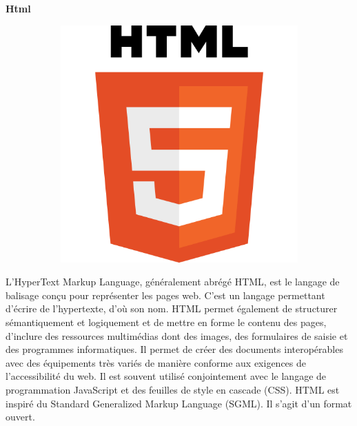 \documentclass{article}
\begin{document}
\textbf{Html}
\newline
\begin{figure}[h!]
	\centering
  	\begin{subfigure}[b]{0.15\linewidth}
	\includegraphics[width=\linewidth]{html5.png}
  	\end{subfigure}
\end{figure}

L’HyperText Markup Language, généralement abrégé HTML, est le langage de balisage conçu pour représenter les pages web. C’est un langage permettant d’écrire de l’hypertexte, d’où son nom. HTML permet également de structurer sémantiquement et logiquement et de mettre en forme le contenu des pages, d’inclure des ressources multimédias dont des images, des formulaires de saisie et des programmes informatiques. Il permet de créer des documents interopérables avec des équipements très variés de manière conforme aux exigences de l’accessibilité du web. Il est souvent utilisé conjointement avec le langage de programmation JavaScript et des feuilles de style en cascade (CSS). HTML est inspiré du Standard Generalized Markup Language (SGML). Il s'agit d'un format ouvert. 
\newline
\end{document}
